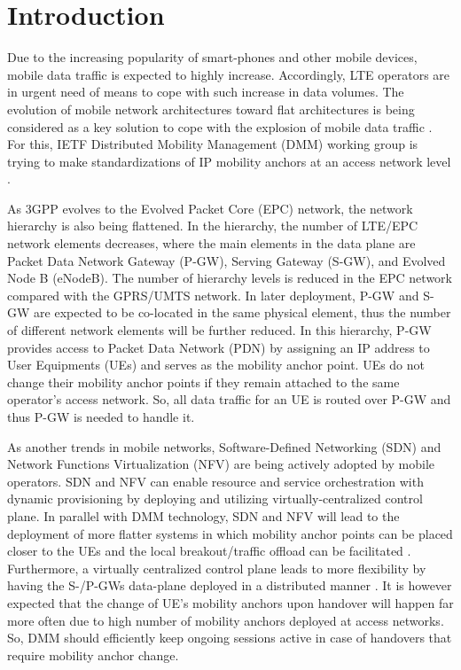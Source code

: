 \documentclass[runningheads,a4paper]{llncs}
\begin{document}
\section{Introduction}

Due to the increasing popularity of smart-phones and other mobile devices, mobile data traffic is expected to highly increase. Accordingly, LTE operators are in urgent need of means to cope with such increase in data volumes. The evolution of mobile network architectures toward flat architectures is being considered as a key solution to cope with the explosion of mobile data traffic \cite{ref5}. For this, IETF Distributed Mobility Management (DMM) working group is trying to make standardizations of IP mobility anchors at an access network level \cite{ref6,ref7}. 

As 3GPP evolves to the Evolved Packet Core (EPC) network, the network hierarchy is also being flattened. In the hierarchy, the number of LTE/EPC network elements decreases, where the main elements in the data plane are Packet Data Network Gateway (P-GW), Serving Gateway (S-GW), and Evolved Node B (eNodeB). The number of hierarchy levels is reduced in the EPC network compared with the GPRS/UMTS network. In later deployment, P-GW and S-GW are expected to be co-located in the same physical element, thus the number of different network elements will be further reduced. In this hierarchy, P-GW provides access to Packet Data Network (PDN) by assigning an IP address to User Equipments (UEs) and serves as the mobility anchor point. UEs do not change their mobility anchor points if they remain attached to the same operator's access network. So, all data traffic for an UE is routed over P-GW and thus P-GW is needed to handle it.

As another trends in mobile networks, Software-Defined Networking (SDN) and Network Functions Virtualization (NFV) are being actively adopted by mobile operators. SDN and NFV can enable resource and service orchestration with dynamic provisioning by deploying and utilizing virtually-centralized control plane. In parallel with DMM technology, SDN and NFV will lead to the deployment of more flatter systems in which mobility anchor points can be placed closer to the UEs and the local breakout/traffic offload can be facilitated \cite{ref8}. Furthermore, a virtually centralized control plane leads to more flexibility by having the S-/P-GWs data-plane deployed in a distributed manner \cite{ref8-1}. It is however expected that the change of UE's mobility anchors upon handover will happen far more often due to high number of mobility anchors deployed at access networks. So, DMM should efficiently keep ongoing sessions active in case of handovers that require mobility anchor change. 
\end{document}
